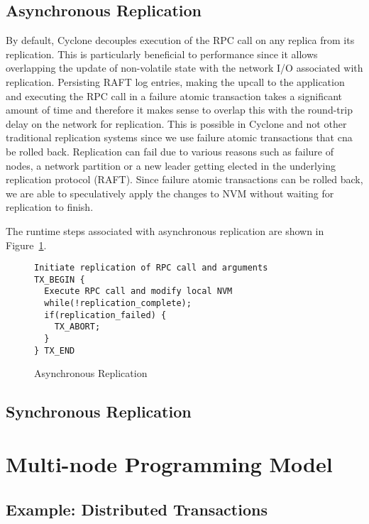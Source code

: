 \documentclass[twocolumn]{article}
\begin{document}
\subsection{Asynchronous Replication}
By default, Cyclone decouples execution of the RPC call on any replica from its
replication. This is particularly beneficial to performance since it allows
overlapping the update of non-volatile state with the network I/O associated
with replication. Persisting RAFT log entries, making the upcall to the
application and executing the RPC call in a failure atomic transaction takes a
significant amount of time and therefore it makes sense to overlap this with the
round-trip delay on the network for replication. This is possible in Cyclone and
not other traditional replication systems since we use failure atomic
transactions that cna be rolled back. Replication can fail due to various
reasons such as failure of nodes, a network partition or a new leader getting
elected in the underlying replication protocol (RAFT). Since failure atomic
transactions can be rolled back, we are able to speculatively apply the changes
to NVM without waiting for replication to finish.

The runtime steps associated with asynchronous replication are shown in
Figure~\ref{fig:async_rep}.

\begin{figure}
{\scriptsize
\begin{verbatim}
Initiate replication of RPC call and arguments
TX_BEGIN {
  Execute RPC call and modify local NVM
  while(!replication_complete);
  if(replication_failed) {
    TX_ABORT;
  }
} TX_END
\end{verbatim}
}
\caption{Asynchronous Replication}
\label{fig:async_rep}
\end{figure}

\subsection{Synchronous Replication}


\section{Multi-node Programming Model}

\subsection{Example: Distributed Transactions}
  
\end{document}
